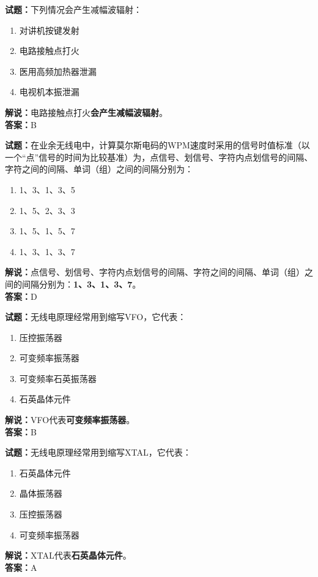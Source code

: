 \documentclass{ctexbook}
\begin{document}
\bigskip


\noindent\textbf{试题：}下列情况会产生减幅波辐射：
\begin{enumerate}[leftmargin=3em]
\item 对讲机按键发射
\item 电路接触点打火
\item 医用高频加热器泄漏
\item 电视机本振泄漏
\end{enumerate}
\noindent\textbf{解说：}电路接触点打火\textbf{会产生减幅波辐射}。\\\noindent\textbf{答案：}B




\bigskip


\noindent\textbf{试题：}在业余无线电中，计算莫尔斯电码的WPM速度时采用的信号时值标准（以一个“点”信号的时间为比较基准）为，点信号、划信号、字符内点划信号的间隔、字符之间的间隔、单词（组）之间的间隔分别为：
\begin{enumerate}[leftmargin=3em]
\item 1、3、1、3、5
\item 1、5、2、3、3
\item 1、5、1、5、7
\item 1、3、1、3、7
\end{enumerate}
\noindent\textbf{解说：}点信号、划信号、字符内点划信号的间隔、字符之间的间隔、单词（组）之间的间隔分别为：\textbf{1、3、1、3、7}。\\\noindent\textbf{答案：}D




\bigskip


\noindent\textbf{试题：}无线电原理经常用到缩写VFO，它代表：
\begin{enumerate}[leftmargin=3em]
\item 压控振荡器
\item 可变频率振荡器
\item 可变频率石英振荡器
\item 石英晶体元件
\end{enumerate}
\noindent\textbf{解说：}VFO代表\textbf{可变频率振荡器}。\\\noindent\textbf{答案：}B



\bigskip


\noindent\textbf{试题：}无线电原理经常用到缩写XTAL，它代表：
\begin{enumerate}[leftmargin=3em]
\item 石英晶体元件
\item 晶体振荡器
\item 压控振荡器
\item 可变频率振荡器
\end{enumerate}
\noindent\textbf{解说：}XTAL代表\textbf{石英晶体元件}。\\\noindent\textbf{答案：}A
\end{document}
